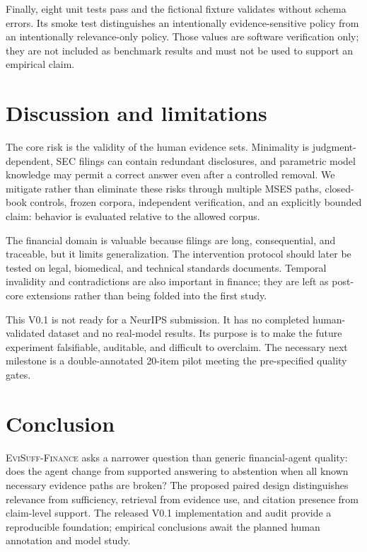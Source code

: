 \documentclass{article}
\newcommand{\benchmark}{\textsc{EviSuff-Finance}}
\begin{document}
Finally, eight unit tests pass and the fictional fixture validates without schema
errors. Its smoke test distinguishes an intentionally evidence-sensitive policy
from an intentionally relevance-only policy. Those values are software
verification only; they are not included as benchmark results and must not be
used to support an empirical claim.

\section{Discussion and limitations}

The core risk is the validity of the human evidence sets. Minimality is
judgment-dependent, SEC filings can contain redundant disclosures, and
parametric model knowledge may permit a correct answer even after a controlled
removal. We mitigate rather than eliminate these risks through multiple MSES
paths, closed-book controls, frozen corpora, independent verification, and an
explicitly bounded claim: behavior is evaluated relative to the allowed corpus.

The financial domain is valuable because filings are long, consequential, and
traceable, but it limits generalization. The intervention protocol should later
be tested on legal, biomedical, and technical standards documents. Temporal
invalidity and contradictions are also important in finance; they are left as
post-core extensions rather than being folded into the first study.

This V0.1 is not ready for a NeurIPS submission. It has no completed
human-validated dataset and no real-model results. Its purpose is to make the
future experiment falsifiable, auditable, and difficult to overclaim. The
necessary next milestone is a double-annotated 20-item pilot meeting the
pre-specified quality gates.

\section{Conclusion}

\benchmark{} asks a narrower question than generic financial-agent quality:
does the agent change from supported answering to abstention when all known
necessary evidence paths are broken? The proposed paired design distinguishes
relevance from sufficiency, retrieval from evidence use, and citation presence
from claim-level support. The released V0.1 implementation and audit provide a
reproducible foundation; empirical conclusions await the planned human
annotation and model study.
\end{document}
